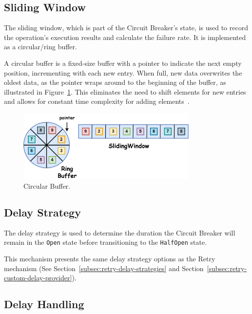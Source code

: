 \subsection{Sliding Window}\label{subsec:cbreaker-sliding-window}

The sliding window, which is part of the Circuit Breaker's state, is used to record the operation's execution results and calculate the failure rate.
It is implemented as a circular/ring buffer.

A circular buffer is a fixed-size buffer with a pointer to indicate the next empty position, incrementing with each new entry.
When full, new data overwrites the oldest data, as the pointer wraps around to the beginning of the buffer, as illustrated in Figure~\ref{fig:05_circular-buffer}.
This eliminates the need to shift elements for new entries and allows for constant time complexity for adding elements~\cite{circular-buffer}.

\begin{figure}[!htb]
    \centering
    \includegraphics[width=0.8\textwidth]{../figures/05_circular-buffer}
    \caption{Circular Buffer.}
    \label{fig:05_circular-buffer}
\end{figure}

\subsection{Delay Strategy}\label{subsec:cbreaker-delay-strategy}

The delay strategy is used
to determine the duration the Circuit Breaker will remain in the \texttt{Open} state before transitioning to the \texttt{HalfOpen} state.

This mechanism presents the same delay strategy options as the Retry mechanism (See Section~\ref{subsec:retry-delay-strategies} and Section~\ref{subsec:retry-custom-delay-provider}).

\subsection{Delay Handling}\label{subsec:cbreaker-delay-handling}

